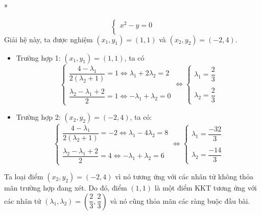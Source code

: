 \begin{solution}{*}
\begin{enumerate}[label=(\roman*)]
\begin{equation}
\begin{cases}
                x^2 - y = 0\\
            \end{cases}
        \end{equation}
        Giải hệ này, ta được nghiệm  $(x_1, y_1) = (1, 1)$ và $(x_2, y_2) = (-2, 4)$. 
        \begin{itemize}
            \item Trường hợp 1: $(x_1, y_1) = (1, 1)$, ta có 
            \begin{equation}
                \begin{cases}
                    \dfrac{4-\lambda_1}{2(\lambda_2 + 1)} = 1 \Leftrightarrow \lambda_1 + 2\lambda_2 = 2\\\\
                    \dfrac{\lambda_2 - \lambda_1 + 2}{2} = 1 \Leftrightarrow -\lambda_1 + \lambda_2 = 0
                \end{cases}
                \Leftrightarrow \begin{cases}
                    \lambda_1 = \dfrac{2}{3}\\\\
                    \lambda_2 = \dfrac{2}{3}
                \end{cases}
            \end{equation}
            \item Trường hợp 2: $(x_2, y_2) = (-2, 4)$, ta có:
            \begin{equation}
                \begin{cases}
                    \dfrac{4-\lambda_1}{2(\lambda_2 + 1)} = -2 \Leftrightarrow \lambda_1  -4\lambda_2 = 8\\\\
                    \dfrac{\lambda_2 - \lambda_1 + 2}{2} = 4 \Leftrightarrow -\lambda_1 + \lambda_2 = 6
                \end{cases}
                \Leftrightarrow \begin{cases}
                    \lambda_1 = \dfrac{-32}{3}\\\\
                    \lambda_2 = \dfrac{-14}{3}
                \end{cases}
            \end{equation}
        \end{itemize}
        Ta loại điểm $(x_2, y_2) = (-2, 4)$ vì nó tương ứng với các nhân tử không thỏa mãn trường hợp đang xét. Do đó, điểm $(1,1)$ là một điểm KKT tương ứng với các nhân tử $(\lambda_1, \lambda_2) = \left(\dfrac{2}{3},\dfrac{2}{3}\right)$ và nó cũng thỏa mãn các ràng buộc đầu bài.

\end{enumerate}
\end{solution}
